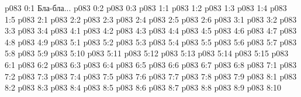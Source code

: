 \author{Глава Серафимов}
\vs p083 0:1  Бла-бла...
\vs p083 0:2 
\vs p083 0:3 
\vs p083 1:1 
\vs p083 1:2 
\vs p083 1:3 
\vs p083 1:4 \pc 
\vs p083 1:5 
\vs p083 2:1 
\vs p083 2:2 
\vs p083 2:3 
\vs p083 2:4 
\vs p083 2:5 
\vs p083 2:6 
\vs p083 3:1 
\vs p083 3:2 
\vs p083 3:3 
\vs p083 3:4 
\vs p083 4:1 
\vs p083 4:2 \pc 
\vs p083 4:3 
\vs p083 4:4 \pc 
\vs p083 4:5 
\vs p083 4:6 
\vs p083 4:7 
\vs p083 4:8 
\vs p083 4:9 
\vs p083 5:1 
\vs p083 5:2 
\vs p083 5:3 
\vs p083 5:4 
\vs p083 5:5 
\vs p083 5:6 
\vs p083 5:7 
\vs p083 5:8 
\vs p083 5:9 
\vs p083 5:10 \pc 
\vs p083 5:11 
\vs p083 5:12 
\vs p083 5:13 
\vs p083 5:14 
\vs p083 5:15 
\vs p083 6:1 
\vs p083 6:2 
\vs p083 6:3 
\vs p083 6:4 \pc 
\vs p083 6:5 
\vs p083 6:6 \pc 
\vs p083 6:7 
\vs p083 6:8 
\vs p083 7:1 
\vs p083 7:2 
\vs p083 7:3 
\vs p083 7:4 
\vs p083 7:5 
\vs p083 7:6 
\vs p083 7:7 
\vs p083 7:8 
\vs p083 7:9 \pc 
{}
\vs p083 8:1 
\vs p083 8:2 
\vs p083 8:3 
\vs p083 8:4 
\vs p083 8:5 
\vs p083 8:6 \pc 
\vs p083 8:7 
\vs p083 8:8 
\vs p083 8:9 
\vsetoff
\vs p083 8:10 
\quizlink
